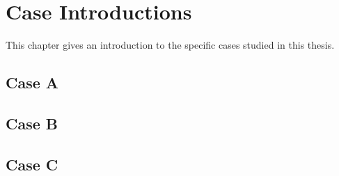 \chapter{Case Introductions}
This chapter gives an introduction to the specific cases studied in this thesis.  
\section{Case A}

\section{Case B}

\section{Case C}